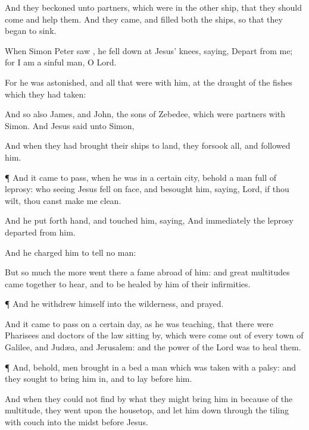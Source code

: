 {And they
beckoned
unto
{}
partners,
which were
in the
other
ship, that they should
come and
help
them.
And they
came,
and
filled
both the
ships, so
that
they began to
sink.

When
Simon
Peter
saw
{}, he fell down
at
Jesus’
knees,
saying,
Depart
from
me;
for I
am a
sinful
man, O
Lord.

For
he was
astonished,
and
all
that were
with
him,
at the
draught of the
fishes
which they had
taken:

And
so
{}
also
James,
and
John, the
sons of
Zebedee,
which
were
partners
with
Simon.
And
Jesus
said
unto
Simon,
{}

And when they had
brought
their
ships
to
land, they
forsook
all, and
followed
him.


\par }{\PP {}¶
And it came to
pass,
when
he
was
in a
certain
city,
behold a
man
full of
leprosy: who
seeing
Jesus
fell
on
{}
face, and
besought
him,
saying,
Lord,
if thou
wilt, thou
canst
make
me
clean.

And he put
forth
{}
hand, and
touched
him,
saying,
{}
And
immediately the
leprosy
departed
from
him.

And
he
charged
him to
tell no
man:
{}

But so much the
more went
there a
fame
abroad
of
him:
and
great
multitudes came
together to
hear,
and to be
healed
by
him
of
their
infirmities.


\par }{\PP {}¶
And he
withdrew
himself
into the
wilderness,
and
prayed.

And it came to
pass
on a
certain
day,
as
he
was
teaching,
that there
were
Pharisees
and doctors of the
law sitting
by,
which
were
come
out of
every
town of
Galilee,
and
Judæa,
and
Jerusalem:
and the
power of the
Lord
was
{}
to
heal
them.


\par }{\PP {}¶
And,
behold,
men
brought
in a
bed a
man
which
was taken with a
palsy:
and they
sought
{} to
bring
him
in,
and to
lay
{}
before
him.

And when they
could
not
find
by
what
{} they might
bring
him
in because
of the
multitude, they
went
upon the
housetop, and
let
him
down
through the
tiling
with
{}
couch
into the
midst
before
Jesus.

}
